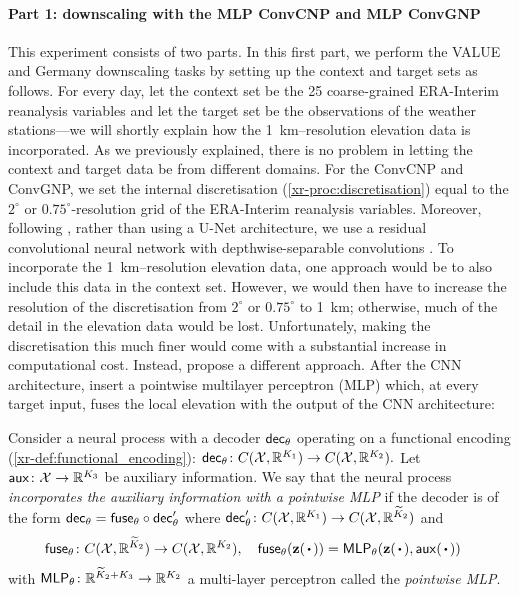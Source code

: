 \documentclass[12pt, twoside]{report}
\newcommand{\xrprefix}[1]{xr-#1}
\begin{document}
\paragraph{Part 1: downscaling with the MLP ConvCNP and MLP ConvGNP}
This experiment consists of two parts.
In this first part, we perform the VALUE and Germany downscaling tasks by setting up the context and target sets as follows.
For every day,
let the context set be the 25 coarse-grained ERA-Interim reanalysis variables
and let the target set be the observations of the weather stations---we will shortly explain how the \SI{1}{km}--resolution elevation data is incorporated.
As we previously explained, there is no problem in letting the context and target data be from different domains.
For the ConvCNP and ConvGNP, we set the internal discretisation (\cref{\xrprefix{proc:discretisation}}) equal to the $2^\circ$ or $0.75^\circ$-resolution grid of the ERA-Interim reanalysis variables.
Moreover, following \textcite{Vaughan:2022:Convolutional_Conditional_Neural_Processes_for}, rather than using a U-Net architecture, we use a residual convolutional neural network  \parencite{He:2016:Deep_Residual_Learning_for_Image} with depthwise-separable convolutions \parencite{Chollet:2017:Xception_Deep_Learning_With_Depthwise}.
To incorporate the \SI{1}{km}--resolution elevation data, one approach would be to also include this data in the context set.
However, we would then have to increase the resolution of the discretisation from $2^\circ$ or $0.75^\circ$ to \SI{1}{km}; 
otherwise, much of the detail in the elevation data would be lost.
Unfortunately, making the discretisation this much finer would come with a substantial increase in computational cost.
Instead, \citeauthor{Vaughan:2022:Convolutional_Conditional_Neural_Processes_for} propose a different approach.
After the CNN architecture, insert a pointwise multilayer perceptron (MLP) which, at every target input, fuses the local elevation with the output of the CNN architecture:

\begin{definition}
    \label{def:pointwise_MLP}
    Consider a neural process with a decoder $\mathsf{dec}_\theta$ operating on a functional encoding (\cref{\xrprefix{def:functional_encoding}}):
    $
        \mathsf{dec}_\theta \colon C(\mathcal{X}, \mathbb{R}^{K_1}) \to C(\mathcal{X}, \mathbb{R}^{K_2}).
    $
    Let $\mathsf{aux}\colon \mathcal{X} \to \mathbb{R}^{K_3}$ be auxiliary information.
    We say that the neural process \emph{incorporates the auxiliary information with a pointwise MLP} if the decoder is of the form $\mathsf{dec}_\theta = \mathsf{fuse}_\theta \circ \mathsf{dec}'_\theta$ where
    $\mathsf{dec}'_\theta\colon C(\mathcal{X}, \mathbb{R}^{K_1}) \to C(\mathcal{X}, \mathbb{R}^{\widetilde K_2})$ and
    \begin{align}
        \mathsf{fuse}_\theta &\colon C(\X, \R^{\widetilde K_2}) \to C(\X, \R^{K_2}), \quad
        \mathsf{fuse}_\theta(\vz(\vardot)) = \mathsf{MLP}_\theta(\vz(\vardot), \mathsf{aux}(\vardot))
    \end{align}
    with $\mathsf{MLP}_\theta \colon \mathbb{R}^{\widetilde K_2 + K_3} \to \mathbb{R}^{K_2}$ a multi-layer perceptron called the \emph{pointwise MLP}.
\end{definition}
\end{document}
